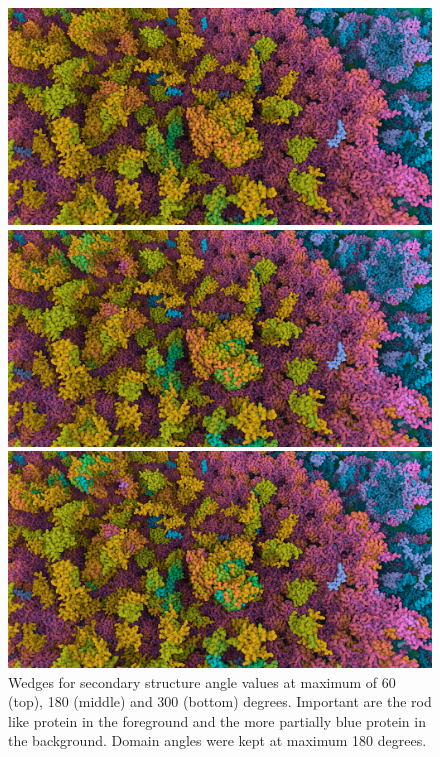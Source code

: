\documentclass{article}
\begin{document}
	\begin{figure}[t]
		\includegraphics[width=0.95\linewidth,keepaspectratio]{supplementaryMaterial/secondary60} 
		
		\vspace{0.1cm}
		
		\includegraphics[width=0.95\linewidth,keepaspectratio]{supplementaryMaterial/secondary180} 
		
		\vspace{0.1cm}
		
		\includegraphics[width=0.95\linewidth,keepaspectratio]{supplementaryMaterial/secondary300} 
		\caption{Wedges for secondary structure angle values at maximum of 60 (top), 180 (middle) and 300 (bottom) degrees. Important are the rod like protein in the foreground and the more partially blue protein in the background. Domain angles were kept at maximum 180 degrees.}
	\end{figure}
	
\end{document}

